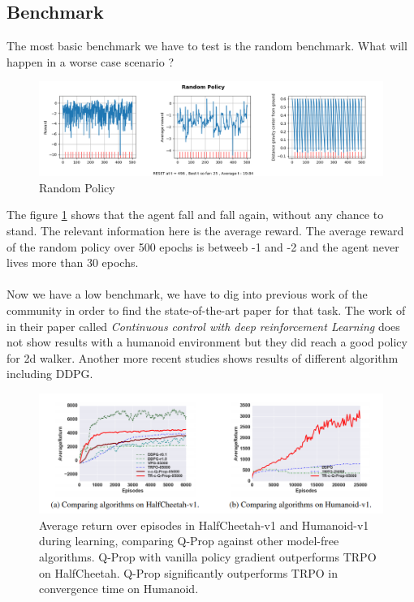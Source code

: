 \documentclass{article}
\begin{document}
\subsection{Benchmark}

The most basic benchmark we have to test is the random benchmark. What will
happen in a worse case scenario ? 

\begin{figure}[ht]
  \centering
  \includegraphics[width=\textwidth]{randompolicy}
  \caption{Random Policy}
  \label{fig:randompolicy}
\end{figure}

The figure \ref{fig:randompolicy} shows that the agent fall and fall again,
without any chance to stand. The relevant information here is the average
reward. The average reward of the random policy over 500 epochs is betweeb -1
and -2 and the agent never lives more than 30 epochs.
\paragraph{}
Now we have a low benchmark, we have to dig into previous work of the community
in order to find the state-of-the-art paper for that task. The work of
\citeauthor{journals/corr/LillicrapHPHETS15} in their paper called
\textit{Continuous control with deep reinforcement Learning} does not show
results with a humanoid environment but they did reach a good policy for 2d
walker. Another more recent studies\cite{GuLilGhaTurLev17} shows results of
different algorithm including DDPG. 

\begin{figure}[ht]
  \centering
  \includegraphics[width=\textwidth]{benchmark}
  \caption{Average return over episodes in HalfCheetah-v1 and Humanoid-v1 during
    learning, comparing Q-Prop against other model-free algorithms. Q-Prop with
    vanilla policy gradient outperforms TRPO on HalfCheetah. Q-Prop
    significantly outperforms TRPO in convergence time on Humanoid.}
  \label{fig:benchmark}
\end{figure}
\end{document}
